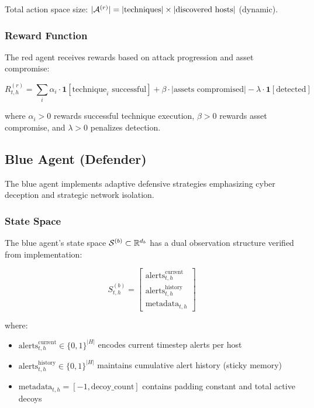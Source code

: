 \documentclass[11pt]{article}
\theoremstyle{definition}
\theoremstyle{plain}
\begin{document}
Total action space size: $|\mathcal{A}^{(r)}| = |\text{techniques}| \times |\text{discovered hosts}|$ (dynamic).

\subsubsection{Reward Function}
The red agent receives rewards based on attack progression and asset compromise:

\begin{equation}
R_{t,h}^{(r)} = \sum_{i} \alpha_i \cdot \mathbf{1}[\text{technique}_i \text{ successful}] + \beta \cdot |\text{assets compromised}| - \lambda \cdot \mathbf{1}[\text{detected}]
\end{equation}

where $\alpha_i > 0$ rewards successful technique execution, $\beta > 0$ rewards asset compromise, and $\lambda > 0$ penalizes detection.

\subsection{Blue Agent (Defender)}

The blue agent implements adaptive defensive strategies emphasizing cyber deception and strategic network isolation.

\subsubsection{State Space}
The blue agent's state space $\mathcal{S}^{(b)} \subset \mathbb{R}^{d_b}$ has a dual observation structure verified from implementation:

\begin{equation}
S_{t,h}^{(b)} = \begin{bmatrix}
\text{alerts}_{t,h}^{\text{current}} \\
\text{alerts}_{t,h}^{\text{history}} \\
\text{metadata}_{t,h}
\end{bmatrix}
\end{equation}

where:
\begin{itemize}
    \item $\text{alerts}_{t,h}^{\text{current}} \in \{0,1\}^{|H|}$ encodes current timestep alerts per host
    \item $\text{alerts}_{t,h}^{\text{history}} \in \{0,1\}^{|H|}$ maintains cumulative alert history (sticky memory)
    \item $\text{metadata}_{t,h} = [-1, \text{decoy\_count}]$ contains padding constant and total active decoys
\end{itemize}
\end{document}
